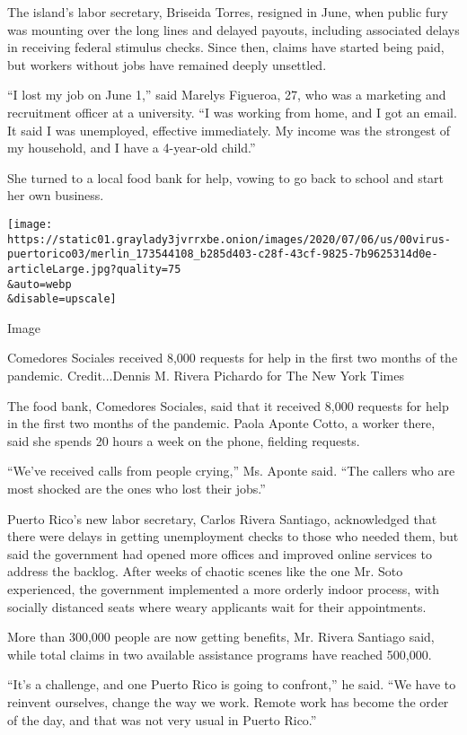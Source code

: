 The island's labor secretary, Briseida Torres, resigned in June, when
public fury was mounting over the long lines and delayed payouts,
including associated delays in receiving federal stimulus checks. Since
then, claims have started being paid, but workers without jobs have
remained deeply unsettled.

``I lost my job on June 1,'' said Marelys Figueroa, 27, who was a
marketing and recruitment officer at a university. ``I was working from
home, and I got an email. It said I was unemployed, effective
immediately. My income was the strongest of my household, and I have a
4-year-old child.''

She turned to a local food bank for help, vowing to go back to school
and start her own business.

\texttt{[image: https://static01.graylady3jvrrxbe.onion/images/2020/07/06/us/00virus-puertorico03/merlin\_173544108\_b285d403-c28f-43cf-9825-7b9625314d0e-articleLarge.jpg?quality=75\\\&auto=webp\\\&disable=upscale]}

Image

Comedores Sociales received 8,000 requests for help in the first two
months of the pandemic. Credit...Dennis M. Rivera Pichardo for The New
York Times

The food bank, Comedores Sociales, said that it received 8,000 requests
for help in the first two months of the pandemic. Paola Aponte Cotto, a
worker there, said she spends 20 hours a week on the phone, fielding
requests.

``We've received calls from people crying,'' Ms. Aponte said. ``The
callers who are most shocked are the ones who lost their jobs.''

Puerto Rico's new labor secretary, Carlos Rivera Santiago, acknowledged
that there were delays in getting unemployment checks to those who
needed them, but said the government had opened more offices and
improved online services to address the backlog. After weeks of chaotic
scenes like the one Mr. Soto experienced, the government implemented a
more orderly indoor process, with socially distanced seats where weary
applicants wait for their appointments.

More than 300,000 people are now getting benefits, Mr. Rivera Santiago
said, while total claims in two available assistance programs have
reached 500,000.

``It's a challenge, and one Puerto Rico is going to confront,'' he said.
``We have to reinvent ourselves, change the way we work. Remote work has
become the order of the day, and that was not very usual in Puerto
Rico.''

